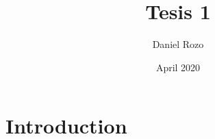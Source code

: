 \documentclass{article}
\title{Tesis 1}
\author{Daniel Rozo}
\date{April 2020}
\begin{document}
\maketitle

\section{Introduction}
\end{document}
